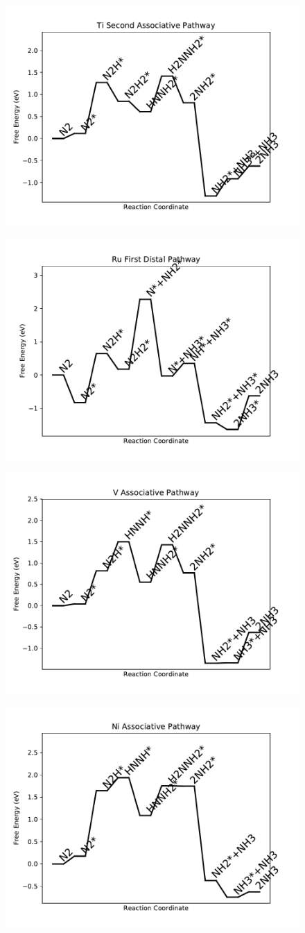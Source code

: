 \documentclass[journal=jacsat,manuscript=article]{achemso}
\begin{document}
\begin{figure}
\includegraphics[width=0.5\linewidth]{data/plots/Ti_associative_2.pdf}
\label{fig:Ti_associative_2}
\end{figure}

\begin{figure}
\includegraphics[width=0.5\linewidth]{data/plots/Ru_distal_1.pdf}
\label{fig:Ru_distal_1}
\end{figure}

\begin{figure}
\includegraphics[width=0.5\linewidth]{data/plots/V_associative.pdf}
\label{fig:V_associative}
\end{figure}

\begin{figure}
\includegraphics[width=0.5\linewidth]{data/plots/Ni_associative.pdf}
\label{fig:Ni_associative}
\end{figure}
\end{document}
